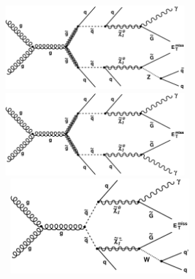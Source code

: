 \vspace{5mm}
\begin{minipage}{0.90\linewidth}
\begin{center}
\centering
\mbox{\includegraphics[height=0.7\textwidth, width=0.5\textwidth]{THESISPLOTS/SinglePhoton_gluino.pdf} \quad \quad
\includegraphics[height=0.7\textwidth, width=0.5\textwidth]{THESISPLOTS/Diphoton_gluino.pdf}} \\
\hspace{0.5cm}
\mbox{   \includegraphics[height=0.7\textwidth, width=0.5\textwidth]{THESISPLOTS/SinglePhoton_squark.pdf}\quad \quad
}
\end{center}
\end{minipage}
